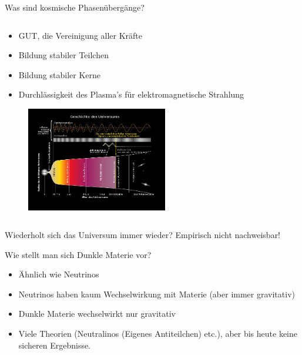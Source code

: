 \begin{frame}{Was sind kosmische Phasenübergänge?}
   \begin{columns}
 \begin{column}{0.9\textwidth}
  \begin{itemize}
    \item  GUT, die Vereinigung aller Kräfte
    \item  Bildung stabiler Teilchen
    \item  Bildung stabiler Kerne
    \item  Durchlässigkeit des Plasma's für elektromagnetische Strahlung
  \end{itemize}
\begin{figure}
  \centering
  \includegraphics[width=0.55\textwidth]{images/Frage1.png}
\end{figure}
\end{column}
\end{columns}
\end{frame}


\begin{frame}{Wiederholt sich das Universum immer wieder?}
Empirisch nicht nachweisbar!
\end{frame}


\begin{frame}{Wie stellt man sich Dunkle Materie vor?}
  \begin{itemize}
    \setlength\itemsep{2em}
    \item Ähnlich wie Neutrinos
    \item Neutrinos haben kaum Wechselwirkung mit Materie (aber immer
    gravitativ)
    \item Dunkle Materie wechselwirkt nur gravitativ
    \item  Viele Theorien (Neutralinos (Eigenes Antiteilchen) etc.),
    aber bis heute keine sicheren Ergebnisse.
  \end{itemize}
\end{frame}

